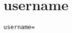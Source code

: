 \section{username}
\label{configuration:Username}
\AvailableInCsharpOnly{\TODO}
\begin{lstlisting}[style=Props,caption={Usage example for \textit{username}}]
username=
\end{lstlisting}